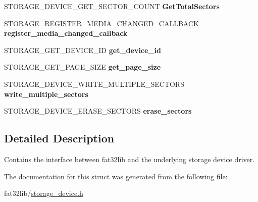 \begin{DoxyCompactItemize}
\item 
\hypertarget{struct_s_t_o_r_a_g_e___d_e_v_i_c_e_a73751a16727be85183f74ddb3a09eef9}{S\-T\-O\-R\-A\-G\-E\-\_\-\-D\-E\-V\-I\-C\-E\-\_\-\-G\-E\-T\-\_\-\-S\-E\-C\-T\-O\-R\-\_\-\-C\-O\-U\-N\-T {\bfseries Get\-Total\-Sectors}}\label{struct_s_t_o_r_a_g_e___d_e_v_i_c_e_a73751a16727be85183f74ddb3a09eef9}

\item 
\hypertarget{struct_s_t_o_r_a_g_e___d_e_v_i_c_e_a4811e9869fe2b92c669ec55a8a805a25}{S\-T\-O\-R\-A\-G\-E\-\_\-\-R\-E\-G\-I\-S\-T\-E\-R\-\_\-\-M\-E\-D\-I\-A\-\_\-\-C\-H\-A\-N\-G\-E\-D\-\_\-\-C\-A\-L\-L\-B\-A\-C\-K {\bfseries register\-\_\-media\-\_\-changed\-\_\-callback}}\label{struct_s_t_o_r_a_g_e___d_e_v_i_c_e_a4811e9869fe2b92c669ec55a8a805a25}

\item 
\hypertarget{struct_s_t_o_r_a_g_e___d_e_v_i_c_e_a967ef76a2314a56c00ae7e8c548b5089}{S\-T\-O\-R\-A\-G\-E\-\_\-\-G\-E\-T\-\_\-\-D\-E\-V\-I\-C\-E\-\_\-\-I\-D {\bfseries get\-\_\-device\-\_\-id}}\label{struct_s_t_o_r_a_g_e___d_e_v_i_c_e_a967ef76a2314a56c00ae7e8c548b5089}

\item 
\hypertarget{struct_s_t_o_r_a_g_e___d_e_v_i_c_e_abc7d53ac89abb8ee92f01485f7a501fc}{S\-T\-O\-R\-A\-G\-E\-\_\-\-G\-E\-T\-\_\-\-P\-A\-G\-E\-\_\-\-S\-I\-Z\-E {\bfseries get\-\_\-page\-\_\-size}}\label{struct_s_t_o_r_a_g_e___d_e_v_i_c_e_abc7d53ac89abb8ee92f01485f7a501fc}

\item 
\hypertarget{struct_s_t_o_r_a_g_e___d_e_v_i_c_e_af6404abe27af2258ec1a47892752f8c4}{S\-T\-O\-R\-A\-G\-E\-\_\-\-D\-E\-V\-I\-C\-E\-\_\-\-W\-R\-I\-T\-E\-\_\-\-M\-U\-L\-T\-I\-P\-L\-E\-\_\-\-S\-E\-C\-T\-O\-R\-S {\bfseries write\-\_\-multiple\-\_\-sectors}}\label{struct_s_t_o_r_a_g_e___d_e_v_i_c_e_af6404abe27af2258ec1a47892752f8c4}

\item 
\hypertarget{struct_s_t_o_r_a_g_e___d_e_v_i_c_e_afcf9038bac9b987005badd3c0ae50843}{S\-T\-O\-R\-A\-G\-E\-\_\-\-D\-E\-V\-I\-C\-E\-\_\-\-E\-R\-A\-S\-E\-\_\-\-S\-E\-C\-T\-O\-R\-S {\bfseries erase\-\_\-sectors}}\label{struct_s_t_o_r_a_g_e___d_e_v_i_c_e_afcf9038bac9b987005badd3c0ae50843}

\end{DoxyCompactItemize}


\subsection{Detailed Description}
Contains the interface between fat32lib and the underlying storage device driver. 

The documentation for this struct was generated from the following file\-:\begin{DoxyCompactItemize}
\item 
fat32lib/\hyperlink{storage__device_8h}{storage\-\_\-device.\-h}\end{DoxyCompactItemize}
